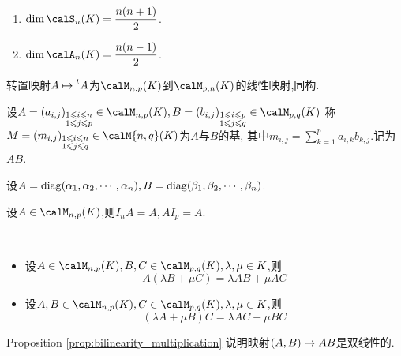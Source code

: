 \begin{exer}
    \begin{enumerate}
        \item $\dim \calS_n(K) = \dfrac{n(n + 1)}{2}$.
        \item $\dim \calA_n(K) = \dfrac{n(n - 1)}{2}$.
    \end{enumerate}
\end{exer}

\begin{prop}
    转置映射$A \mapsto \prescript{t}{}{A}$为$\calM_{n, p}(K)$到$\calM_{p, n}(K)$的线性映射,同构.
\end{prop}

\begin{deff}
    设$A = (a_{i, j})_{\substack{1 \leqslant i \leqslant n \\ 1 \leqslant j \leqslant p}} \in \calM_{n, p}(K),
    B = (b_{i, j})_{\substack{1 \leqslant i \leqslant p \\ 1 \leqslant j \leqslant q}} \in \calM_{p, q}(K)$
    称$M = (m_{i, j})_{\substack{1 \leqslant i \leqslant n \\ 1 \leqslant j \leqslant q}} \in \calM{n, q}(K)$为$A$与$B$的基,
    其中$m_{i, j} = \sum\limits_{k = 1}^p a_{i, k}b_{k,j}$.记为$AB$.
\end{deff}

\begin{prop}
    设$A = \operatorname{diag}(\alpha_1, \alpha_2, \cdots, \alpha_n), B = \operatorname{diag}(\beta_1, \beta_2, \cdots, \beta_n)$.
\end{prop}

\begin{prop}
    设$A \in \calM_{n, p}(K)$,则$I_nA = A, AI_p = A$.
\end{prop}

\begin{prop} \label{prop:bilinearity_multiplication} $\ $
    \begin{itemize}
        \item 设$A \in \calM_{n, p}(K), B, C \in \calM_{p, q}(K), \lambda, \mu \in K$,则
            \[ A(\lambda B + \mu C) = \lambda AB + \mu AC \]
        \item 设$A, B \in \calM_{n, p}(K), C \in \calM_{p, q}(K), \lambda, \mu \in K$,则
            \[ (\lambda A + \mu B)C = \lambda AC + \mu BC \]
    \end{itemize}
\end{prop}

\begin{rqq}
    Proposition \ref{prop:bilinearity_multiplication} 说明映射$(A, B) \mapsto AB$是双线性的.
\end{rqq}

